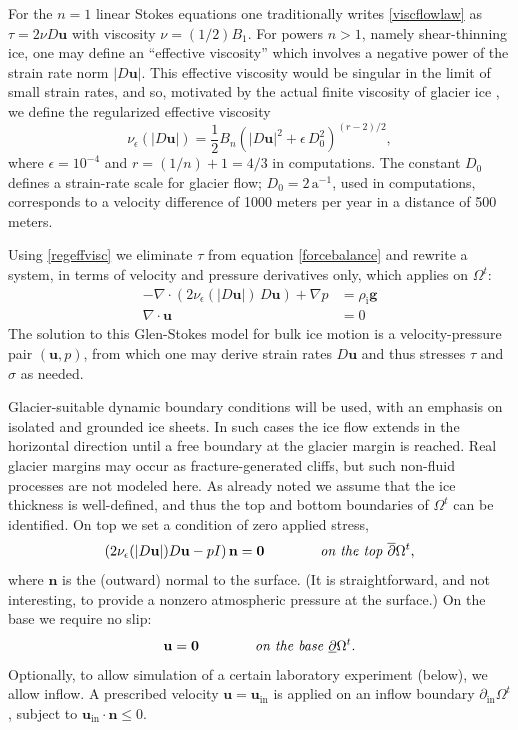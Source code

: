 \documentclass[letterpaper,final,12pt,reqno]{amsart}
\newcommand{\eps}{\epsilon}
\newcommand{\Div}{\nabla\cdot}
\newcommand{\bn}{\mathbf{n}}
\newcommand{\bu}{\mathbf{u}}
\newcommand{\bzero}{\bm{0}}
\newcommand{\rhoi}{\rho_{\text{i}}}
\begin{document}
For the $n=1$ linear Stokes equations \cite{Elmanetal2014} one traditionally writes \eqref{viscflowlaw} as $\tau = 2\nu D\bu$ with viscosity $\nu = (1/2) B_1$.  For powers $n>1$, namely shear-thinning ice, one may define an ``effective viscosity'' which involves a negative power of the strain rate norm $|D\bu|$.  This effective viscosity would be singular in the limit of small strain rates, and so, motivated by the actual finite viscosity of glacier ice \cite{GreveBlatter2009}, we define the regularized effective viscosity
\begin{equation}
\nu_\eps(|D\bu|) = \frac{1}{2} B_n \left(|D\bu|^2 + \eps\, D_0^2\right)^{(r-2)/2}, \label{regeffvisc}
\end{equation}
where $\eps = 10^{-4}$ and $r=(1/n)+1=4/3$ in computations.  The constant $D_0$ defines a strain-rate scale for glacier flow; $D_0 = 2 \,\text{a}^{-1}$, used in computations, corresponds to a velocity difference of 1000 meters per year in a distance of 500 meters.

Using \eqref{regeffvisc} we eliminate $\tau$ from equation \eqref{forcebalance} and rewrite a system, in terms of velocity and pressure derivatives only, which applies on $\Omega^t$:
\begin{align}
- \nabla \cdot \left(2 \nu_\eps(|D\bu|)\, D\bu\right) + \nabla p &= \rhoi \mathbf{g} \label{stokes} \\
\Div \bu &= 0 \label{incompagain}
\end{align}
The solution to this Glen-Stokes model for bulk ice motion is a velocity-pressure pair $(\bu,p)$, from which one may derive strain rates $D\bu$ and thus stresses $\tau$ and $\sigma$ as needed.

Glacier-suitable dynamic boundary conditions will be used, with an emphasis on isolated and grounded ice sheets.  In such cases the ice flow extends in the horizontal direction until a free boundary at the glacier margin is reached.  Real glacier margins may occur as fracture-generated cliffs, but such non-fluid processes are not modeled here.  As already noted we assume that the ice thickness is well-defined, and thus the top and bottom boundaries of $\Omega^t$ can be identified.  On top we set a condition of zero applied stress,
\begin{equation}
\left(2 \nu_\eps(|D\bu|) D\bu - pI\right) \bn = \bzero  \qquad \qquad \text{\emph{on the top} } \overline{\partial} \Omega^t, \label{topbc}
\end{equation}
where $\bn$ is the (outward) normal to the surface.  (It is straightforward, and not interesting, to provide a nonzero atmospheric pressure at the surface.)  On the base we require no slip:
\begin{equation}
\bu = \bzero  \qquad\qquad \text{\emph{on the base} } \underline{\partial} \Omega^t. \label{basebc}
\end{equation}
Optionally, to allow simulation of a certain laboratory experiment \cite{SayagWorster2013} (below), we allow inflow.  A prescribed velocity $\bu = \bu_{\text{in}}$ is applied on an inflow boundary $\partial_{\text{in}} \Omega^t$, subject to $\bu_{\text{in}}\cdot \bn \le 0$.
\end{document}
